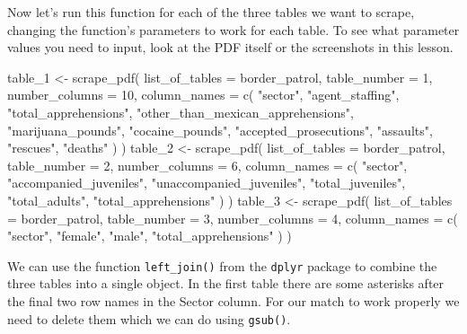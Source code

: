 \documentclass[
]{krantz}
\makeatletter
\newenvironment{Shaded}{\begin{snugshade}}{\end{snugshade}}
\newcommand{\AttributeTok}[1]{\textcolor[rgb]{0.61,0.61,0.61}{#1}}
\newcommand{\DecValTok}[1]{\textcolor[rgb]{0.06,0.06,0.06}{#1}}
\newcommand{\FunctionTok}[1]{\textcolor[rgb]{0,0,0}{#1}}
\newcommand{\NormalTok}[1]{#1}
\newcommand{\OtherTok}[1]{\textcolor[rgb]{0.37,0.37,0.37}{#1}}
\newcommand{\StringTok}[1]{\textcolor[rgb]{0.5,0.5,0.5}{#1}}
\newenvironment{kframe}{%
\medskip{}
\setlength{\fboxsep}{.8em}
 \def\at@end@of@kframe{}%
 \ifinner\ifhmode%
  \def\at@end@of@kframe{\end{minipage}}%
  \begin{minipage}{\columnwidth}%
 \fi\fi%
 \def\FrameCommand##1{\hskip\@totalleftmargin \hskip-\fboxsep
 \colorbox{shadecolor}{##1}\hskip-\fboxsep
     \hskip-\linewidth \hskip-\@totalleftmargin \hskip\columnwidth}%
 \MakeFramed {\advance\hsize-\width
   \@totalleftmargin\z@ \linewidth\hsize
   \@setminipage}}%
 {\par\unskip\endMakeFramed%
 \at@end@of@kframe}
\renewenvironment{Shaded}{\begin{kframe}}{\end{kframe}}
\makeatother
\begin{document}
Now let's run this function for each of the three tables we
want to scrape, changing the function's parameters to work
for each table. To see what parameter values you need to
input, look at the PDF itself or the screenshots in this
lesson.

\begin{Shaded}
\begin{Highlighting}[]
\NormalTok{table\_1 }\OtherTok{\textless{}{-}} \FunctionTok{scrape\_pdf}\NormalTok{(}
  \AttributeTok{list\_of\_tables =}\NormalTok{ border\_patrol,}
  \AttributeTok{table\_number =} \DecValTok{1}\NormalTok{,}
  \AttributeTok{number\_columns =} \DecValTok{10}\NormalTok{,}
  \AttributeTok{column\_names =} \FunctionTok{c}\NormalTok{(}
    \StringTok{"sector"}\NormalTok{,}
    \StringTok{"agent\_staffing"}\NormalTok{,}
    \StringTok{"total\_apprehensions"}\NormalTok{,}
    \StringTok{"other\_than\_mexican\_apprehensions"}\NormalTok{,}
    \StringTok{"marijuana\_pounds"}\NormalTok{,}
    \StringTok{"cocaine\_pounds"}\NormalTok{,}
    \StringTok{"accepted\_prosecutions"}\NormalTok{,}
    \StringTok{"assaults"}\NormalTok{,}
    \StringTok{"rescues"}\NormalTok{,}
    \StringTok{"deaths"}
\NormalTok{  )}
\NormalTok{)}
\NormalTok{table\_2 }\OtherTok{\textless{}{-}} \FunctionTok{scrape\_pdf}\NormalTok{(}
  \AttributeTok{list\_of\_tables =}\NormalTok{ border\_patrol,}
  \AttributeTok{table\_number =} \DecValTok{2}\NormalTok{,}
  \AttributeTok{number\_columns =} \DecValTok{6}\NormalTok{,}
  \AttributeTok{column\_names =} \FunctionTok{c}\NormalTok{(}
    \StringTok{"sector"}\NormalTok{,}
    \StringTok{"accompanied\_juveniles"}\NormalTok{,}
    \StringTok{"unaccompanied\_juveniles"}\NormalTok{,}
    \StringTok{"total\_juveniles"}\NormalTok{,}
    \StringTok{"total\_adults"}\NormalTok{,}
    \StringTok{"total\_apprehensions"}
\NormalTok{  )}
\NormalTok{)}
\NormalTok{table\_3 }\OtherTok{\textless{}{-}} \FunctionTok{scrape\_pdf}\NormalTok{(}
  \AttributeTok{list\_of\_tables =}\NormalTok{ border\_patrol,}
  \AttributeTok{table\_number =} \DecValTok{3}\NormalTok{,}
  \AttributeTok{number\_columns =} \DecValTok{4}\NormalTok{,}
  \AttributeTok{column\_names =} \FunctionTok{c}\NormalTok{(}
    \StringTok{"sector"}\NormalTok{,}
    \StringTok{"female"}\NormalTok{,}
    \StringTok{"male"}\NormalTok{,}
    \StringTok{"total\_apprehensions"}
\NormalTok{  )}
\NormalTok{)}
\end{Highlighting}
\end{Shaded}

We can use the function \texttt{left\_join()} from the
\texttt{dplyr} package to combine the three tables into a
single object. In the first table there are some asterisks
after the final two row names in the Sector column. For our
match to work properly we need to delete them which we can
do using \texttt{gsub()}.
\end{document}
